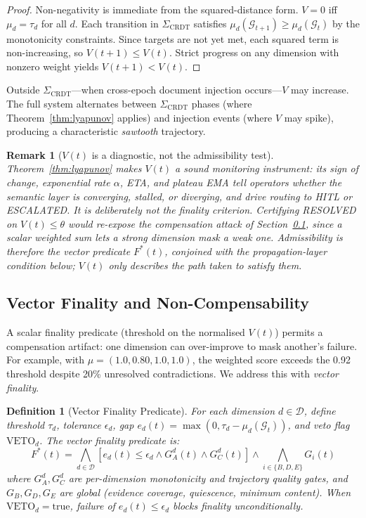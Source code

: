 \documentclass[11pt]{article}
\newtheorem{definition}{Definition}
\newtheorem{remark}{Remark}
\begin{document}
\begin{proof}
Non-negativity is immediate from the squared-distance form.
$V = 0$ iff $\mu_d = \tau_d$ for all $d$.
Each transition in $\Sigma_{\mathrm{CRDT}}$ satisfies $\mu_d(\mathcal{G}_{t+1}) \geq \mu_d(\mathcal{G}_t)$ by the monotonicity constraints.
Since targets are not yet met, each squared term is non-increasing, so $V(t+1) \leq V(t)$.
Strict progress on any dimension with nonzero weight yields $V(t+1) < V(t)$.
\end{proof}

Outside $\Sigma_{\mathrm{CRDT}}$---when cross-epoch document injection occurs---$V$ may increase.
The full system alternates between $\Sigma_{\mathrm{CRDT}}$ phases (where Theorem~\ref{thm:lyapunov} applies) and injection events (where $V$ may spike), producing a characteristic \emph{sawtooth} trajectory.

\begin{remark}[$V(t)$ is a diagnostic, not the admissibility test]
\label{rem:v-diagnostic}
Theorem~\ref{thm:lyapunov} makes $V(t)$ a sound \emph{monitoring} instrument: its sign of change, exponential rate $\alpha$, ETA, and plateau EMA tell operators whether the semantic layer is converging, stalled, or diverging, and drive routing to HITL or ESCALATED. It is deliberately \emph{not} the finality criterion. Certifying RESOLVED on $V(t) \le \theta$ would re-expose the compensation attack of Section~\ref{sec:vector-finality}, since a scalar weighted sum lets a strong dimension mask a weak one. Admissibility is therefore the \emph{vector} predicate $F^*(t)$, conjoined with the propagation-layer condition below; $V(t)$ only describes the path taken to satisfy them.
\end{remark}

\subsection{Vector Finality and Non-Compensability}
\label{sec:vector-finality}

A scalar finality predicate (threshold on the normalised $V(t)$) permits a compensation artifact: one dimension can over-improve to mask another's failure.
For example, with $\mu = (1.0, 0.80, 1.0, 1.0)$, the weighted score exceeds the 0.92 threshold despite 20\% unresolved contradictions.
We address this with \emph{vector finality}.

\begin{definition}[Vector Finality Predicate]
\label{def:vector-finality}
For each dimension $d \in \mathcal{D}$, define threshold $\tau_d$, tolerance $\epsilon_d$, gap $e_d(t) = \max(0, \tau_d - \mu_d(\mathcal{G}_t))$, and veto flag $\mathrm{VETO}_d$.
The vector finality predicate is:
\[
F^*(t) = \bigwedge_{d \in \mathcal{D}} \left[ e_d(t) \leq \epsilon_d \wedge G_A^d(t) \wedge G_C^d(t) \right] \wedge \bigwedge_{i \in \{B,D,E\}} G_i(t)
\]
where $G_A^d, G_C^d$ are per-dimension monotonicity and trajectory quality gates, and $G_B, G_D, G_E$ are global (evidence coverage, quiescence, minimum content).
When $\mathrm{VETO}_d = \mathrm{true}$, failure of $e_d(t) \leq \epsilon_d$ blocks finality unconditionally.
\end{definition}
\end{document}
